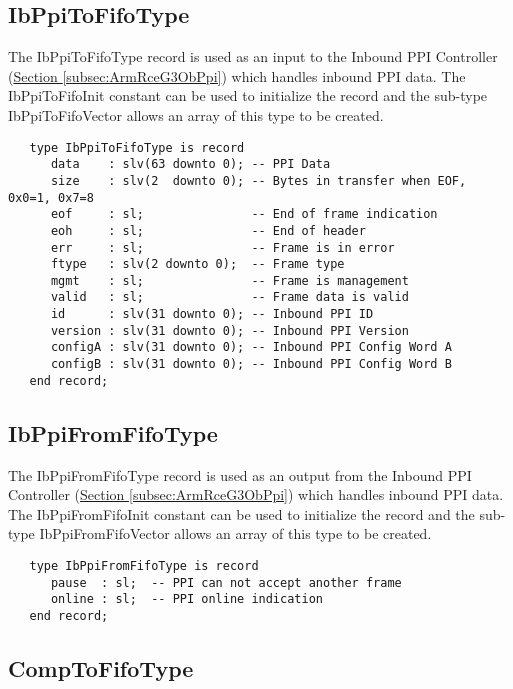 \documentclass[11pt]{article}
\begin{document}
\subsection{IbPpiToFifoType}
\label{subsec:IbPpiToFifoType}

The IbPpiToFifoType record is used as an input to the Inbound PPI Controller (\hyperref[subsec:ArmRceG3ObPpi]{Section \ref*{subsec:ArmRceG3ObPpi}}) which handles inbound PPI data. 
The IbPpiToFifoInit constant can be used to initialize the record and the sub-type IbPpiToFifoVector allows an array of this type to be created.

\small
\begin{verbatim}
   type IbPpiToFifoType is record
      data    : slv(63 downto 0); -- PPI Data
      size    : slv(2  downto 0); -- Bytes in transfer when EOF, 0x0=1, 0x7=8
      eof     : sl;               -- End of frame indication
      eoh     : sl;               -- End of header
      err     : sl;               -- Frame is in error
      ftype   : slv(2 downto 0);  -- Frame type
      mgmt    : sl;               -- Frame is management
      valid   : sl;               -- Frame data is valid
      id      : slv(31 downto 0); -- Inbound PPI ID
      version : slv(31 downto 0); -- Inbound PPI Version
      configA : slv(31 downto 0); -- Inbound PPI Config Word A
      configB : slv(31 downto 0); -- Inbound PPI Config Word B
   end record;
\end{verbatim}
\normalsize

\subsection{IbPpiFromFifoType}
\label{subsec:IbPpiFromFifoType}

The IbPpiFromFifoType record is used as an output from the Inbound PPI Controller (\hyperref[subsec:ArmRceG3ObPpi]{Section \ref*{subsec:ArmRceG3ObPpi}}) which handles inbound PPI data. 
The IbPpiFromFifoInit constant can be used to initialize the record and the sub-type IbPpiFromFifoVector allows an array of this type to be created.

\small
\begin{verbatim}
   type IbPpiFromFifoType is record
      pause  : sl;  -- PPI can not accept another frame
      online : sl;  -- PPI online indication
   end record;
\end{verbatim}
\normalsize

\subsection{CompToFifoType}
\label{subsec:CompToFifoType}
\end{document}
